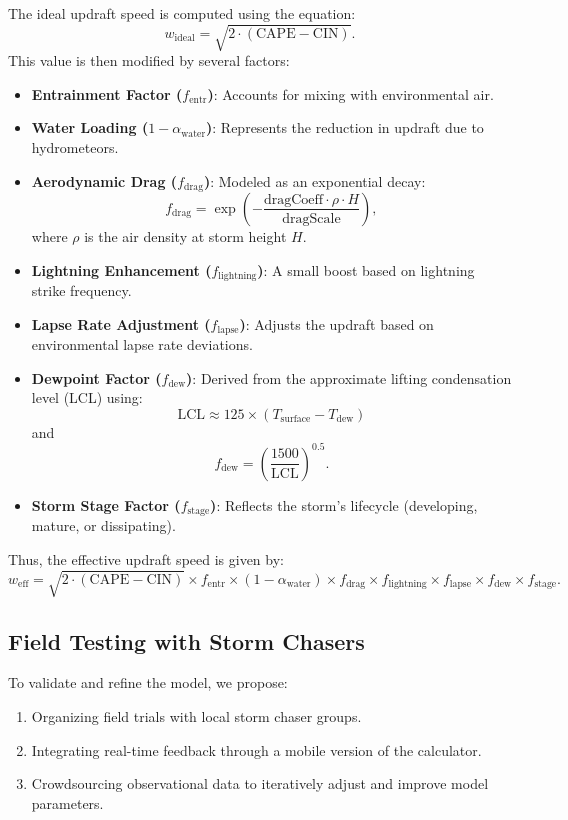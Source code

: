 \documentclass[12pt]{article}
\begin{document}
The ideal updraft speed is computed using the equation:
\[
w_{\text{ideal}} = \sqrt{2 \cdot (\text{CAPE} - \text{CIN})}.
\]
This value is then modified by several factors:
\begin{itemize}[label=\textbullet]
  \item \textbf{Entrainment Factor (\(f_{\text{entr}}\))}: Accounts for mixing with environmental air.
  \item \textbf{Water Loading (\(1 - \alpha_{\text{water}}\))}: Represents the reduction in updraft due to hydrometeors.
  \item \textbf{Aerodynamic Drag (\(f_{\text{drag}}\))}: Modeled as an exponential decay:
  \[
  f_{\text{drag}} = \exp\left(-\frac{\text{dragCoeff}\cdot \rho \cdot H}{\text{dragScale}}\right),
  \]
  where \(\rho\) is the air density at storm height \(H\).
  \item \textbf{Lightning Enhancement (\(f_{\text{lightning}}\))}: A small boost based on lightning strike frequency.
  \item \textbf{Lapse Rate Adjustment (\(f_{\text{lapse}}\))}: Adjusts the updraft based on environmental lapse rate deviations.
  \item \textbf{Dewpoint Factor (\(f_{\text{dew}}\))}: Derived from the approximate lifting condensation level (LCL) using:
  \[
  \text{LCL} \approx 125 \times (T_{\text{surface}} - T_{\text{dew}})
  \]
  and
  \[
  f_{\text{dew}} = \left(\frac{1500}{\text{LCL}}\right)^{0.5}.
  \]
  \item \textbf{Storm Stage Factor (\(f_{\text{stage}}\))}: Reflects the storm's lifecycle (developing, mature, or dissipating).
\end{itemize}

Thus, the effective updraft speed is given by:
\[
w_{\text{eff}} = \sqrt{2 \cdot (\text{CAPE} - \text{CIN})} \times f_{\text{entr}} \times (1 - \alpha_{\text{water}}) \times f_{\text{drag}} \times f_{\text{lightning}} \times f_{\text{lapse}} \times f_{\text{dew}} \times f_{\text{stage}}.
\]

\subsection{Field Testing with Storm Chasers}

To validate and refine the model, we propose:
\begin{enumerate}[label=\arabic*.]
  \item Organizing field trials with local storm chaser groups.
  \item Integrating real-time feedback through a mobile version of the calculator.
  \item Crowdsourcing observational data to iteratively adjust and improve model parameters.
\end{enumerate}
\end{document}

